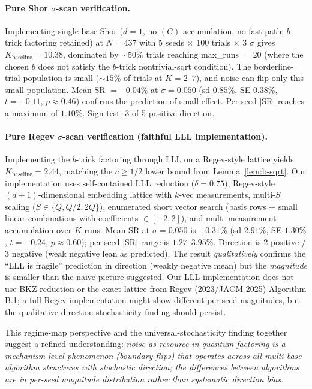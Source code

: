 \documentclass[11pt]{article}
\begin{document}
\paragraph{Pure Shor $\sigma$-scan verification.}
Implementing single-base Shor ($d = 1$, no $(C)$ accumulation, no fast path; $b$-trick factoring retained) at $N = 437$ with $5$ seeds $\times$ $100$ trials $\times$ $3$ $\sigma$ gives $K_{\text{baseline}} = 10.38$, dominated by $\sim 50\%$ trials reaching max\_runs $= 20$ (where the chosen $b$ does not satisfy the $b$-trick nontrivial-sqrt condition). The borderline-trial population is small ($\sim 15\%$ of trials at $K = 2$--$7$), and noise can flip only this small population. Mean SR $= -0.04\%$ at $\sigma = 0.050$ (sd $0.85\%$, SE $0.38\%$, $t = -0.11$, $p \approx 0.46$) confirms the prediction of small effect. Per-seed $|$SR$|$ reaches a maximum of $1.10\%$. Sign test: 3 of 5 positive direction.

\paragraph{Pure Regev $\sigma$-scan verification (faithful LLL implementation).}
Implementing the $b$-trick factoring through LLL on a Regev-style lattice yields $K_{\text{baseline}} = 2.44$, matching the $c \geq 1/2$ lower bound from Lemma~\ref{lem:b-sqrt}. Our implementation uses self-contained LLL reduction ($\delta = 0.75$), Regev-style $(d+1)$-dimensional embedding lattice with $k$-vec measurements, multi-$S$ scaling ($S \in \{Q, Q/2, 2Q\}$), enumerated short vector search (basis rows + small linear combinations with coefficients $\in [-2, 2]$), and multi-measurement accumulation over $K$ runs. Mean SR at $\sigma = 0.050$ is $-0.31\%$ (sd $2.91\%$, SE $1.30\%$, $t = -0.24$, $p \approx 0.60$); per-seed $|$SR$|$ range is $1.27$--$3.95\%$. Direction is 2 positive / 3 negative (weak negative lean as predicted). The result \emph{qualitatively} confirms the ``LLL is fragile'' prediction in direction (weakly negative mean) but the \emph{magnitude} is smaller than the naive picture suggested. Our LLL implementation does not use BKZ reduction or the exact lattice from Regev (2023/JACM 2025) Algorithm B.1; a full Regev implementation might show different per-seed magnitudes, but the qualitative direction-stochasticity finding should persist.

This regime-map perspective and the universal-stochasticity finding together suggest a refined understanding: \emph{noise-as-resource in quantum factoring is a mechanism-level phenomenon (boundary flips) that operates across all multi-base algorithm structures with stochastic direction; the differences between algorithms are in per-seed magnitude distribution rather than systematic direction bias}.
\end{document}
